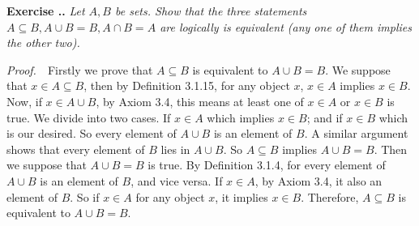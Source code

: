 \documentclass{book}
\newcommand{\pff}{\vspace{.25em}\noindent\emph{Proof.}~~}
\newcounter{Exercise}[section]
\renewcommand{\theExercise}{\thesection.\arabic{Exercise}.}
\newcommand{\new}{\vspace{1.5em}\noindent\textbf{{Exercise \stepcounter{Exercise}\textbf{\theExercise}}} }
\begin{document}
\begin{comment}
\new\emph{Note that $\{x\in A:P(x)\text{ is true}\}$ is always a subset of $A$ (why?), though it could be as large as $A$ or as small as the empty set. One can verify that the axiom of substitution works for specification, thus if $A=A'$ then $\{x\in A:P(x)\}=\{x\in A':P(x)\}$ (why?, p.40).}

\pff We prove the first claim by contradiction. Suppose that there exists an object $y$ such that $\{x\in A:P(x)\text{ is true}\}\nsubseteq A$. By Axiom 3.5, exists an object $y$ such that $y\in A$ and $P(y)$ is true implies that $y\notin A$. But there only has one of $y\in A$ or $y\notin A$ is true, a contradiction.

Now we turn to the second claim that if $A=A'$ then $\{x\in A:P(x)\}=\{x\in A':P(x)\}$. By Axiom 3.5, for every objects $y$, we have $y\in A$ and $P(y)$ is true; and for every objects $y'\in A'$ and $P(y')$ is true. Because $A=A'$, then $y=y'$ for $y\in A$ and $y'\in A'$ by Definition 3.1.4. so we can substitute $y$ with $y'$ or vice versa, and hold the statements be true. So, $\{x\in A:P(x)\}=\{x\in A':P(x)\}$\qed

\new\emph{The sets $\emptyset$ and $\emptyset$ are disjoint but not distinct (why?, p.42).}

\pff We have proved the uniqueness of empty set, now we need to prove that $\emptyset\cap\emptyset=\emptyset$. This claim is equivalent to there exists a object $x$ such that $x\notin\emptyset\cap\emptyset$, and by Definition 3.1.23, this means that at least one of $x\notin\emptyset$ or $x\notin\emptyset$ is true. It is hold for all objects $x$ by definition of empty set, then we can know that $\emptyset\cap\emptyset$ also an empty set. And we have proved that empty set is unique. So, $\emptyset\cap\emptyset=\emptyset$.\qed
\end{comment}

\new\emph{Let $A,B$ be sets. Show that the three statements $A\subseteq B,A\cup B=B,A\cap B=A$ are logically is equivalent (any one of them implies the other two).}

\pff Firstly we prove that $A\subseteq B$ is equivalent to $A\cup B=B$. We suppose that $x\in A\subseteq B$, then by Definition 3.1.15, for any object $x$, $x\in A$ implies $x\in B$. Now, if $x\in A\cup B$, by Axiom 3.4, this means at least one of $x\in A$ or $x\in B$ is true. We divide into two cases. If $x\in A$ which implies $x\in B$; and if $x\in B$ which is our desired. So every element of $A\cup B$ is an element of $B$. A similar argument shows that every element of $B$ lies in $A\cup B$. So $A\subseteq B$ implies $A\cup B=B$. Then we suppose that $A\cup B=B$ is true. By Definition 3.1.4, for every element of $A\cup B$ is an element of $B$, and vice versa. If $x\in A$, by Axiom 3.4, it also an element of $B$. So if $x\in A$ for any object $x$, it implies $x\in B$. Therefore, $A\subseteq B$ is equivalent to $A\cup B=B$.
\end{document}
